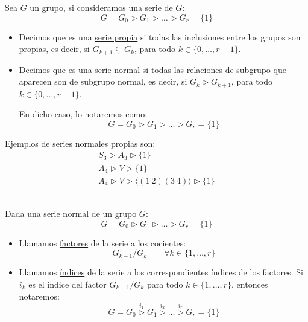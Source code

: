 \begin{definicion}
    Sea $G$ un grupo, si consideramos una serie de $G$:
    \begin{equation*}
        G = G_0 > G_1 > \ldots > G_r = \{1\}
    \end{equation*}
    \begin{itemize}
        \item Decimos que es una \underline{serie propia} si todas las inclusiones entre los grupos son propias, es decir, si $G_{k+1} \subsetneq G_{k}$, para todo $k \in \{0,\ldots,r-1\}$.
        \item Decimos que es una \underline{serie normal} si todas las relaciones de subgrupo que aparecen son de subgrupo normal, es decir, si $G_k \rhd G_{k+1}$, para todo $k \in \{0,\ldots,r-1\}$.

            En dicho caso, lo notaremos como:
            \begin{equation*}
                G = G_0 \rhd G_1 \rhd \ldots \rhd G_r = \{1\}
            \end{equation*}
    \end{itemize}
\end{definicion}

\begin{ejemplo}
    Ejemplos de series normales propias son:
    \begin{gather*}
        S_3 \rhd A_3 \rhd \{1\} \\
        A_4 \rhd V \rhd \{1\} \\
        A_4 \rhd V \rhd \langle (1\ 2)(3\ 4) \rangle \rhd \{1\}
    \end{gather*}
\end{ejemplo}

\begin{definicion}\ \\
    Dada una serie normal de un grupo $G$:
    \begin{equation*}
        G = G_0 \rhd G_1 \rhd \ldots \rhd G_r = \{1\}
    \end{equation*}
    \begin{itemize}
        \item Llamamos \underline{factores} de la serie a los cocientes:
            \begin{equation*}
                G_{k-1}/G_k \qquad \forall k\in \{1,\ldots,r\}
            \end{equation*}
        \item Llamamos \underline{índices} de la serie a los correspondientes índices de los factores. Si $i_k$ es el índice del factor $G_{k-1}/G_k$ para todo $k\in \{1,\ldots,r\}$, entonces notaremos:
            \begin{equation*}
                G = G_0 \stackrel{i_1}{\rhd} G_1 \stackrel{i_2}{\rhd} \ldots \stackrel{i_r}{\rhd} G_r = \{1\}
            \end{equation*}
    \end{itemize}
\end{definicion}

